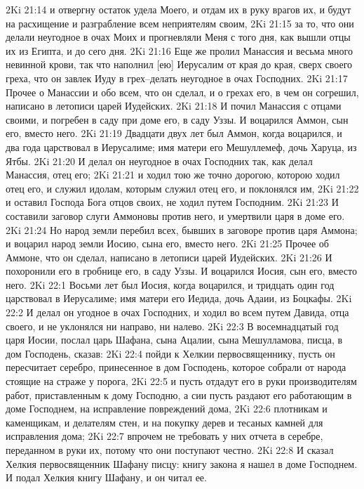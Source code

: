 2Ki 21:14  и отвергну остаток удела Моего, и отдам их в руку врагов их, и будут на расхищение и разграбление всем неприятелям своим,
2Ki 21:15  за то, что они делали неугодное в очах Моих и прогневляли Меня с того дня, как вышли отцы их из Египта, и до сего дня.
2Ki 21:16  Еще же пролил Манассия и весьма много невинной крови, так что наполнил [ею] Иерусалим от края до края, сверх своего греха, что он завлек Иуду в грех--делать неугодное в очах Господних.
2Ki 21:17  Прочее о Манассии и обо всем, что он сделал, и о грехах его, в чем он согрешил, написано в летописи царей Иудейских.
2Ki 21:18  И почил Манассия с отцами своими, и погребен в саду при доме его, в саду Уззы. И воцарился Аммон, сын его, вместо него.
2Ki 21:19  Двадцати двух лет был Аммон, когда воцарился, и два года царствовал в Иерусалиме; имя матери его Мешуллемеф, дочь Харуца, из Ятбы.
2Ki 21:20  И делал он неугодное в очах Господних так, как делал Манассия, отец его;
2Ki 21:21  и ходил тою же точно дорогою, которою ходил отец его, и служил идолам, которым служил отец его, и поклонялся им,
2Ki 21:22  и оставил Господа Бога отцов своих, не ходил путем Господним.
2Ki 21:23  И составили заговор слуги Аммоновы против него, и умертвили царя в доме его.
2Ki 21:24  Но народ земли перебил всех, бывших в заговоре против царя Аммона; и воцарил народ земли Иосию, сына его, вместо него.
2Ki 21:25  Прочее об Аммоне, что он сделал, написано в летописи царей Иудейских.
2Ki 21:26  И похоронили его в гробнице его, в саду Уззы. И воцарился Иосия, сын его, вместо него.
2Ki 22:1  Восьми лет был Иосия, когда воцарился, и тридцать один год царствовал в Иерусалиме; имя матери его Иедида, дочь Адаии, из Боцкафы.
2Ki 22:2  И делал он угодное в очах Господних, и ходил во всем путем Давида, отца своего, и не уклонялся ни направо, ни налево.
2Ki 22:3  В восемнадцатый год царя Иосии, послал царь Шафана, сына Ацалии, сына Мешулламова, писца, в дом Господень, сказав:
2Ki 22:4  пойди к Хелкии первосвященнику, пусть он пересчитает серебро, принесенное в дом Господень, которое собрали от народа стоящие на страже у порога,
2Ki 22:5  и пусть отдадут его в руки производителям работ, приставленным к дому Господню, а сии пусть раздают его работающим в доме Господнем, на исправление повреждений дома,
2Ki 22:6  плотникам и каменщикам, и делателям стен, и на покупку дерев и тесаных камней для исправления дома;
2Ki 22:7  впрочем не требовать у них отчета в серебре, переданном в руки их, потому что они поступают честно.
2Ki 22:8  И сказал Хелкия первосвященник Шафану писцу: книгу закона я нашел в доме Господнем. И подал Хелкия книгу Шафану, и он читал ее.
